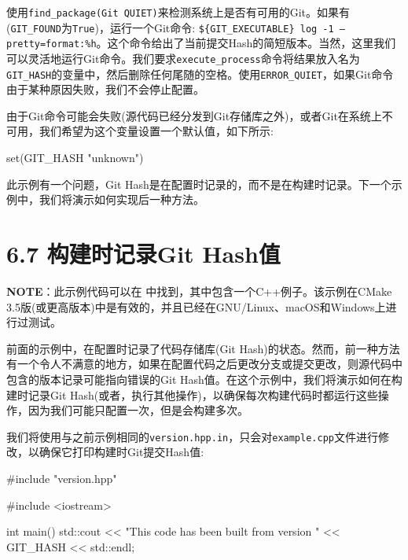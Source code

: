 
使用\texttt{find\_package(Git QUIET)}来检测系统上是否有可用的Git。如果有(\texttt{GIT\_FOUND}为\texttt{True})，运行一个Git命令: \texttt{\$\{GIT\_EXECUTABLE\} log -1 --pretty=format:\%h}。这个命令给出了当前提交Hash的简短版本。当然，这里我们可以灵活地运行Git命令。我们要求\texttt{execute\_process}命令将结果放入名为\texttt{GIT\_HASH}的变量中，然后删除任何尾随的空格。使用\texttt{ERROR\_QUIET}，如果Git命令由于某种原因失败，我们不会停止配置。

由于Git命令可能会失败(源代码已经分发到Git存储库之外)，或者Git在系统上不可用，我们希望为这个变量设置一个默认值，如下所示:

\begin{codebox}[cmake]
set(GIT_HASH "unknown")
\end{codebox}

此示例有一个问题，Git Hash是在配置时记录的，而不是在构建时记录。下一个示例中，我们将演示如何实现后一种方法。


\section{6.7 构建时记录Git Hash值}

\begin{myInfoBox}
\textbf{NOTE}：此示例代码可以在  中找到，其中包含一个C++例子。该示例在CMake 3.5版(或更高版本)中是有效的，并且已经在GNU/Linux、macOS和Windows上进行过测试。
\end{myInfoBox}

前面的示例中，在配置时记录了代码存储库(Git Hash)的状态。然而，前一种方法有一个令人不满意的地方，如果在配置代码之后更改分支或提交更改，则源代码中包含的版本记录可能指向错误的Git Hash值。在这个示例中，我们将演示如何在构建时记录Git Hash(或者，执行其他操作)，以确保每次构建代码时都运行这些操作，因为我们可能只配置一次，但是会构建多次。


我们将使用与之前示例相同的\texttt{version.hpp.in}，只会对\texttt{example.cpp}文件进行修改，以确保它打印构建时Git提交Hash值:

\begin{codebox}[cpp]
#include "version.hpp"

#include <iostream>

int main() {
    std::cout << "This code has been built from version " << GIT_HASH << std::endl;
}
\end{codebox}

